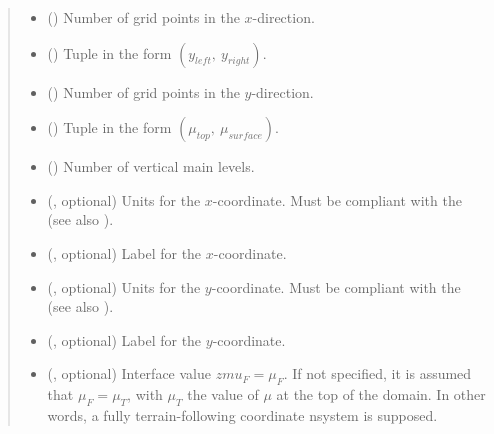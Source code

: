 \documentclass[letterpaper,10pt,english]{sphinxmanual}
\begin{document}
\begin{fulllineitems}
\begin{fulllineitems}
\begin{quote}
\begin{description}
\begin{itemize}
\item {} 
 () \textendash{} Number of grid points in the \(x\)-direction.

\item {} 
 () \textendash{} Tuple in the form \((y_{left}, ~ y_{right})\).

\item {} 
 () \textendash{} Number of grid points in the \(y\)-direction.

\item {} 
 () \textendash{} Tuple in the form \((\mu_{top}, ~ \mu_{surface})\).

\item {} 
 () \textendash{} Number of vertical main levels.

\item {} 
 (, optional) \textendash{} 
Units for the \(x\)-coordinate. Must be compliant
with the  (see also
{\hyperref[\detokenize{api:grids.axis.Axis.__init__}]{}}).


\item {} 
 (, optional) \textendash{} Label for the \(x\)-coordinate.

\item {} 
 (, optional) \textendash{} 
Units for the \(y\)-coordinate. Must be compliant
with the  (see also
{\hyperref[\detokenize{api:grids.axis.Axis.__init__}]{}}).


\item {} 
 (, optional) \textendash{} Label for the \(y\)-coordinate.

\item {} 
 (, optional) \textendash{} Interface value \(zmu_F = \mu_F\). If not
specified, it is assumed that \(\mu_F = \mu_T\), with \(\mu_T\) the
value of \(\mu\) at the top of the domain. In other words, a fully terrain-following
coordinate nsystem is supposed.


\end{itemize}
\end{description}
\end{quote}
\end{fulllineitems}
\end{fulllineitems}
\end{document}
